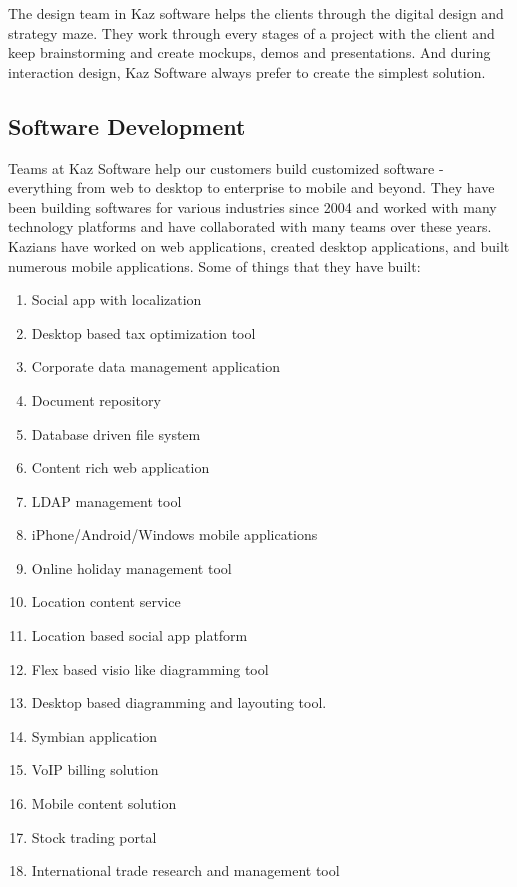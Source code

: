 The design team in Kaz software helps the clients through the digital design and strategy maze.
They work through every stages of a project with the client and keep brainstorming and create mockups, demos and presentations.
And during interaction design, Kaz Software always prefer to create the simplest solution.

\subsection{Software Development}

Teams at Kaz Software help our customers build  customized software - everything from web to desktop to enterprise to mobile and beyond. 
They have been building softwares for various industries since 2004 and worked with many technology platforms and have collaborated with many teams over these years. \\

Kazians have worked on web applications, created desktop applications, and built numerous mobile applications. Some of things that they have built:

\begin{enumerate}
    \item Social app with localization
    \item Desktop based tax optimization tool
    \item Corporate data management application
    \item Document repository
    \item Database driven file system
    \item Content rich web application
    \item LDAP management tool
    \item iPhone/Android/Windows mobile applications
    \item Online holiday management tool
    \item Location content service
    \item Location based social app platform
    \item Flex based visio like diagramming tool
    \item Desktop based diagramming and layouting tool.
    \item Symbian application
    \item VoIP billing solution
    \item Mobile content solution
    \item Stock trading portal
    \item International trade research and management tool
\end{enumerate}

